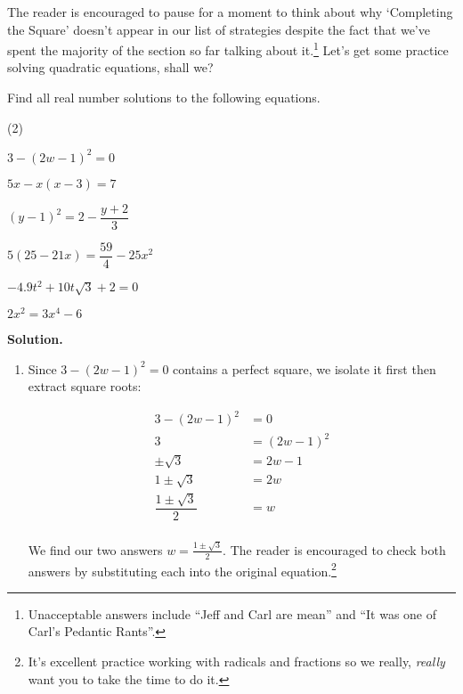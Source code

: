 The reader is encouraged to pause for a moment to think about why `Completing the Square' doesn't appear in our list of strategies despite the fact that we've spent the majority of the section so far talking about it.\footnote{Unacceptable answers include ``Jeff and Carl are mean'' and ``It was one of Carl's Pedantic Rants''.}  Let's get some practice solving quadratic equations, shall we?

\begin{ex}\label{reviewquadraticex}  Find all real number solutions to the following equations.

\begin{tasks}(2)

\task $3 - (2w-1)^2 = 0$

\task $5x - x(x-3) = 7$

\task  $(y-1)^2 = 2 - \dfrac{y+2}{3}$ 

\task $5(25 - 21x) = \dfrac{59}{4} - 25x^2$

\task $-4.9t^2 + 10t\sqrt{3} + 2 = 0$ 

\task $2x^2 = 3x^4 - 6$

\end{tasks}

{\bf Solution.}

\begin{enumerate}

\item  Since $3 - (2w-1)^2 = 0$ contains a perfect square, we isolate it first then extract square roots:

\begin{align*}
3 - (2w-1)^2 & = 0 \\
3 & = (2w-1)^2 \tag{Add $(2w-1)^2$} \\
\pm \sqrt{3} & = 2w - 1 \tag{Extract Square Roots} \\
1 \pm \sqrt{3} & = 2w \tag{Add $1$} \\
\dfrac{1 \pm \sqrt{3}}{2} & = w \tag{Divide by $2$} \\
\end{align*}

We find our two answers $w = \frac{1 \pm \sqrt{3}}{2}$.  The reader is encouraged to check both answers by substituting each into the original equation.\footnote{It's excellent  practice working with radicals and fractions so we really, \emph{really} want you to take the time to do it.}


\end{enumerate}
\end{ex}
